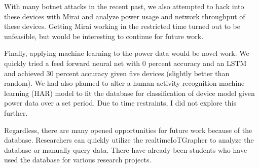 With many botnet attacks in the recent past, we also attempted to hack into these devices with Mirai and analyze power usage and network throughput of these devices. Getting Mirai working in the restricted time turned out to be unfeasible, but would be interesting to continue for future work.

Finally, applying machine learning to the power data would be novel work. We quickly tried a feed forward neural net with 0 percent accuracy and an LSTM and achieved 30 percent accuracy given five devices (slightly better than random). We had also planned to alter a human activity recognition machine learning (HAR) model to fit the database for classification of device model given power data over a set period. Due to time restraints, I did not explore this further.

Regardless, there are many opened opportunities for future work because of the database. Researchers can quickly utilize the realtimeIoTGrapher to analyze the database or manually query data. There have already been students who have used the database for various research projects.